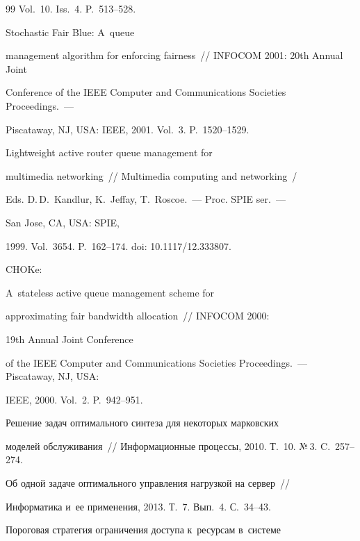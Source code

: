 {{\begin{thebibliography}{99}
Vol.~10. Iss.~4. P.~513--528. 




 Stochastic Fair Blue: A~queue 


management algorithm for enforcing fairness~/\!\!/ INFOCOM 2001: 20th Annual Joint 


Conference of the IEEE Computer and Communications Societies Proceedings.~---


Piscataway, NJ, USA: IEEE, 2001. Vol.~3. P.~1520--1529.




 Lightweight active router queue management for 


multimedia networking~/\!\!/ Multimedia computing and networking~/ 


Eds. D.\,D.~Kandlur, K.~Jeffay, T.~Roscoe.~--- Proc. SPIE ser.~--- 


San Jose, CA, USA: SPIE,


1999. Vol.~3654. P.~162--174. doi: 10.1117/12.333807.







 CHOKe: 


A~stateless active queue management scheme for 


approximating fair bandwidth allocation~/\!\!/ INFOCOM 2000: 


19th Annual Joint Conference 


of the IEEE Computer and Communications Societies Proceedings.~---  Piscataway, NJ, USA: 


IEEE, 2000. Vol.~2. P.~942--951.




 Решение задач оптимального синтеза для некоторых марковских 


моделей обслуживания~/\!\!/ Информационные процессы, 2010. Т.~10. №\,3. C.~257--274. 




 Об одной задаче оптимального управления нагрузкой на сервер~/\!\!/ 


Информатика и~ее применения, 2013. Т.~7. Вып.~4. С.~34--43.




 Пороговая стратегия ограничения доступа к~ресурсам в~сис\-те\-ме



\end{thebibliography}}}
